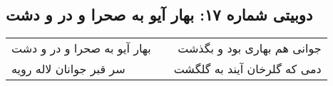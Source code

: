 \begin{center}
\section*{دوبیتی شماره ۱۷: بهار آیو به صحرا و در و دشت}
\label{sec:017}
\begin{longtable}{l p{0.5cm} r}
بهار آیو به صحرا و در و دشت
&&
جوانی هم بهاری بود و بگذشت
\\
سر قبر جوانان لاله رویه
&&
دمی که گلرخان آیند به گلگشت
\\
\end{longtable}
\end{center}
